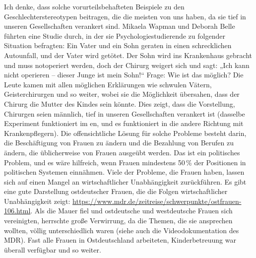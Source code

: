 Ich denke, dass solche vorurteilsbehafteten Beispiele zu den Geschlechterstereotypen beitragen, die
die meisten von uns haben, da sie tief in unseren Gesellschaften verankert sind. Mikaela Wapman und
Deborah Belle führten eine Studie durch, in der sie Psychologiestudierende zu folgender Situation
befragten: Ein Vater und ein Sohn geraten in einen schrecklichen Autounfall, und der Vater wird
getötet. Der Sohn wird ins Krankenhaus gebracht und muss notoperiert werden, doch der Chirurg
weigert sich und sagt: „Ich kann nicht operieren -- dieser Junge ist mein Sohn!“ Frage: Wie ist das
möglich? Die Leute kamen mit allen möglichen Erklärungen wie schwulen Vätern, Geisterchirurgen und so
weiter, wobei sie die Möglichkeit übersahen, dass der Chirurg die Mutter des Kindes sein könnte. Dies
zeigt, dass die Vorstellung, Chirurgen seien männlich, tief in unseren Gesellschaften verankert ist
(dasselbe Experiment funktioniert im en, und es funktioniert in die andere Richtung mit
Krankenpflegern). Die offensichtliche Lösung für solche Probleme besteht darin, die Beschäftigung von
Frauen zu ändern und die Bezahlung von Berufen zu ändern, die üblicherweise von Frauen ausgeübt
werden. Das ist ein politisches Problem, und es wäre hilfreich, wenn Frauen mindestens 50\,\% der
Positionen in politischen Systemen einnähmen. Viele der Probleme, die Frauen haben, lassen sich auf
einen Mangel an wirtschaftlicher Unabhängigkeit zurückführen. Es gibt eine gute Darstellung
ostdeutscher Frauen, die die Folgen wirtschaftlicher Unabhängigkeit zeigt:
\url{https://www.mdr.de/zeitreise/schwerpunkte/ostfrauen-106.html}. Als die Mauer fiel und
ostdeutsche und westdeutsche Frauen sich vereinigten, herrschte große Verwirrung, da die
Themen, die sie ansprechen wollten, völlig unterschiedlich waren (siehe auch die
Videodokumentation des MDR). Fast alle Frauen in Ostdeutschland arbeiteten, Kinderbetreuung war
überall verfügbar und so weiter.


